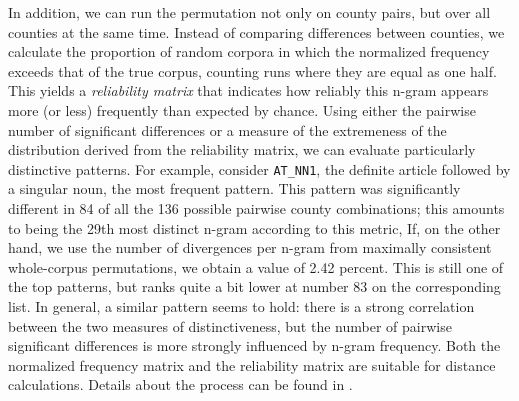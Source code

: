 \documentclass[output=paper]{LSP/langsci}
\begin{document}
In addition, we can run the permutation not only on county pairs, but over all counties at the same time.
Instead of comparing differences between counties, we calculate the proportion of random corpora in which the normalized frequency exceeds that of the true corpus, counting runs where they are equal as one half.
This yields a \emph{reliability matrix} that indicates how reliably this n-gram appears more (or less) frequently than expected by chance.
Using either the pairwise number of significant differences or a measure of the extremeness of the distribution derived from the reliability matrix, we can evaluate particularly distinctive patterns.
For example, consider \texttt{AT\_NN1}, the definite article followed by a singular noun, the most frequent pattern.
This pattern was significantly different in 84 of all the 136 possible pairwise county combinations; this amounts to being the 29th most distinct n-gram according to this metric,
If, on the other hand, we use the number of divergences per n-gram from maximally consistent whole-corpus permutations, we obtain a value of 2.42 percent.
This is still one of the top patterns, but ranks quite a bit lower at number 83 on the corresponding list.
In general, a similar pattern seems to hold: there is a strong correlation between the two measures of distinctiveness, but the number of pairwise significant differences is more strongly influenced by n-gram frequency.
Both the normalized frequency matrix and the reliability matrix are suitable for distance calculations.
Details about the process can be found in \citet[64-74]{wolk_integrating_2014}.
\end{document}
